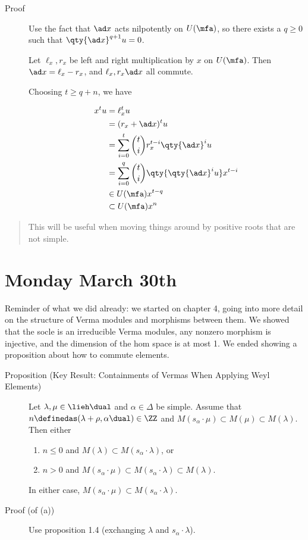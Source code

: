 \begin{description}
\item[Proof]
Use the fact that \(\ad x\) acts nilpotently on \(U(\mfa)\), so there
exists a \(q\geq 0\) such that \(\qty{\ad x}^{q+1}u = 0\).

Let \(\ell_x, r_x\) be left and right multiplication by \(x\) on
\(U(\mfa)\). Then \(\ad x = \ell_x - r_x\), and \(\ell_x, r_x \ad x\)
all commute.

Choosing \(t \geq q + n\), we have

\begin{align*}
x^t u &= \ell_x^t u \\
&= (r_x + \ad x)^t u \\
&= \sum_{i=0}^t {t \choose i} r_x^{t-i} \qty{\ad x}^i u \\
&= \sum_{i=0}^q {t \choose i} \qty{\qty{\ad x}^iu  }x^{t-i} \\
&\in U(\mfa) x^{t-q} \\
&\subset U(\mfa) x^n
\end{align*}
\end{description}

\begin{quote}
This will be useful when moving things around by positive roots that are
not simple.
\end{quote}

\hypertarget{monday-march-30th}{%
\section{Monday March 30th}\label{monday-march-30th}}

Reminder of what we did already: we started on chapter 4, going into
more detail on the structure of Verma modules and morphisms between
them. We showed that the socle is an irreducible Verma modules, any
nonzero morphism is injective, and the dimension of the hom space is at
most 1. We ended showing a proposition about how to commute elements.

\begin{description}
\item[Proposition (Key Result: Containments of Vermas When Applying Weyl
Elements)]
Let \(\lambda, \mu \in \lieh\dual\) and \(\alpha\in\Delta\) be simple.
Assume that \(n\definedas (\lambda + \rho, \alpha\dual) \in \ZZ\) and
\(M(s_\alpha \cdot \mu) \subset M(\mu) \subset M(\lambda)\). Then either

\begin{enumerate}
\def\labelenumi{\alph{enumi}.}
\tightlist
\item
  \(n\leq 0\) and \(M(\lambda) \subset M(s_\alpha \cdot \lambda)\), or
\item
  \(n>0\) and
  \(M(s_\alpha \cdot \mu) \subset M(s_\alpha \cdot \lambda) \subset M(\lambda)\).
\end{enumerate}

In either case,
\(M(s_\alpha \cdot \mu) \subset M(s_\alpha \cdot \lambda)\).
\item[Proof (of (a))]
Use proposition 1.4 (exchanging \(\lambda\) and
\(s_\alpha \cdot \lambda\)).
\end{description}

